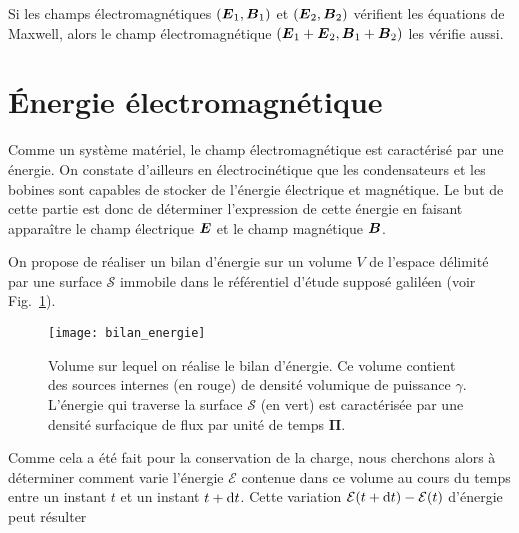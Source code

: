 \begin{exemple}
	Si les champs électromagnétiques $(\vece_1, \vecb_1)$ et 
	$(\vece_2, \vecb_2)$ vérifient les équations de Maxwell, alors le champ
	électromagnétique $(\vece_1 + \vece_2, \vecb_1 + \vecb_2)$ les vérifie
	aussi.
\end{exemple}

\section{Énergie électromagnétique}
Comme un système matériel, le champ électromagnétique est caractérisé par une énergie.
On constate d'ailleurs en électrocinétique que les condensateurs et les bobines sont
capables de stocker de l'énergie électrique et magnétique. Le but de cette partie
est donc de déterminer l'expression de cette énergie en faisant apparaître le
champ électrique $\vece$ et le champ magnétique $\vecb$.

On propose de réaliser un bilan d'énergie sur un volume
$V$ de l'espace délimité par une surface $\mathcal{S}$ 
immobile dans le référentiel d'étude supposé galiléen 
(voir Fig.~\ref{fig:bilan_energie}). 

\begin{figure}[htpb]
	\centering
	\texttt{[image: bilan\_energie]}
	\caption{Volume sur lequel on réalise le bilan d'énergie.
	Ce volume contient des sources internes (en rouge) de densité volumique
	de puissance $\gamma$. L'énergie qui traverse la surface $\mathcal{S}$
	(en vert) est caractérisée par une densité surfacique de flux par unité 
	de temps $\mathbf{\Pi}$.}
	\label{fig:bilan_energie}
\end{figure}
Comme
cela a été fait pour la conservation de la charge, nous cherchons alors à
déterminer comment varie l'énergie $\mathcal{E}$
contenue dans ce volume au cours du temps entre un instant $t$ et un instant
$t + \mathrm{d}t$. Cette variation 
$\mathcal{E}(t + \mathrm{d}t) - \mathcal{E}(t)$ 
d'énergie peut résulter

